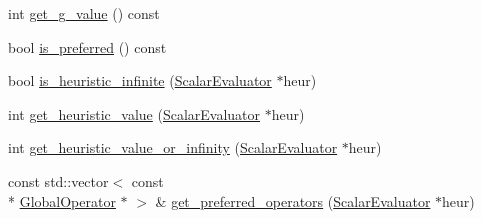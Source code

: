 \begin{DoxyCompactItemize}
int \hyperlink{classEvaluationContext_a6ff33ce72e425200c6474be100023a9e}{get\-\_\-g\-\_\-value} () const 
\item 
bool \hyperlink{classEvaluationContext_afb7203396d74b1fb61b76cc0a44b0610}{is\-\_\-preferred} () const 
\item 
bool \hyperlink{classEvaluationContext_a808f44a988b1b57089b73c548131ec87}{is\-\_\-heuristic\-\_\-infinite} (\hyperlink{classScalarEvaluator}{Scalar\-Evaluator} $\ast$heur)
\item 
int \hyperlink{classEvaluationContext_a0922a801e720bb65221ed95bad2c614a}{get\-\_\-heuristic\-\_\-value} (\hyperlink{classScalarEvaluator}{Scalar\-Evaluator} $\ast$heur)
\item 
int \hyperlink{classEvaluationContext_a3a7931d4b5899fac556b27e8474a08d3}{get\-\_\-heuristic\-\_\-value\-\_\-or\-\_\-infinity} (\hyperlink{classScalarEvaluator}{Scalar\-Evaluator} $\ast$heur)
\item 
const std\-::vector$<$ const \\*
\hyperlink{classGlobalOperator}{Global\-Operator} $\ast$ $>$ \& \hyperlink{classEvaluationContext_a69f4a63ba56f594d3a5fa67e357e7807}{get\-\_\-preferred\-\_\-operators} (\hyperlink{classScalarEvaluator}{Scalar\-Evaluator} $\ast$heur)
\end{DoxyCompactItemize}


